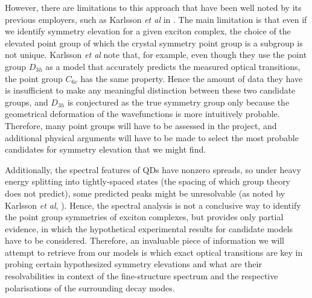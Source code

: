 \documentclass[12pt]{article}
\begin{document}
However, there are limitations to this approach that have been well noted by its previous employers, such as Karlsson \textit{et al} in \cite{karlsson}. The main limitation is that even if we identify symmetry elevation for a given exciton complex, the choice of the elevated point group of which the crystal symmetry point group is a subgroup is not unique. Karlsson \textit{et al} note that, for example, even though they use the point group $D_{3h}$ as a model that accurately predicts the measured optical transitions, the point group $C_{6v}$ has the same property. Hence the amount of data they have is insufficient to make any meaningful distinction between these two candidate groups, and $D_{3h}$ is conjectured as the true symmetry group only because the geometrical deformation of the wavefunctions is more intuitively probable. Therefore, many point groups will have to be assessed in the project, and additional physical arguments will have to be made to select the most probable candidates for symmetry elevation that we might find.

Additionally, the spectral features of QDs have nonzero spreads, so under heavy energy splitting into tightly-spaced states (the spacing of which group theory does not predict), some predicted peaks might be unresolvable (as noted by Karlsson \textit{et al}, \cite{karlsson}). Hence, the spectral analysis is not a conclusive way to identify the point group symmetries of exciton complexes, but provides only partial evidence, in which the hypothetical experimental results for candidate models have to be considered. Therefore, an invaluable piece of information we will attempt to retrieve from our models is which exact optical transitions are key in probing certain hypothesized symmetry elevations and what are their resolvabilities in context of the fine-structure spectrum and the respective polarisations of the surrounding decay modes.
\end{document}
